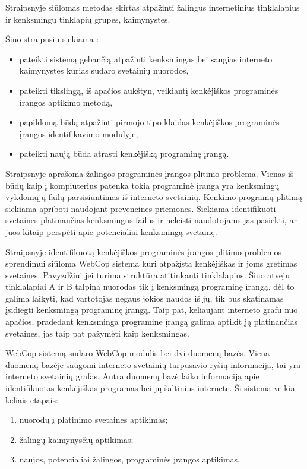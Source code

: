 Straipsnyje  siūlomas  metodas skirtas atpažinti žalingus internetinius tinklalapius ir kenksmingų tinklapių grupes, kaimynystes.

Šiuo straipnsiu siekiama \cite{webcop}:
    \begin{itemize}
        \item pateikti sistemą gebančią atpažinti kenksmingas bei saugias interneto kaimynystes kurias sudaro svetainių nuorodos,
         \item pateikti tikslingą, iš apačios aukštyn, veikiantį kenkėjiškos programinės įrangos aptikimo metodą,
         \item papildomą būdą atpažinti pirmojo tipo klaidas kenkėjiškos programinės įrangos identifikavimo modulyje,
         \item pateikti naują būda atrasti kenkėjišką programinę įrangą.
    \end{itemize}

Straipsnyje aprašoma žalingos programinės įrangos plitimo problema. Vienas iš būdų kaip į kompiuterius patenka  tokia programinė įranga yra kenksmingų vykdomųjų failų parsisiuntimas iš interneto svetainių. Kenkimo programų plitimą siekiama apriboti naudojant prevencines priemones. Siekiama identifikuoti svetaines platinančias kenksmingus failus ir neleisti naudotojams jas pasiekti, ar juos kitaip perspėti apie potencialiai kenksmingą svetainę.

Straipsnyje identifikuotą kenkėjiškos programinės įrangos plitimo problemos sprendimui siūloma WebCop sistema kuri atpažįsta kenkėjiškas ir joms gretimas svetaines. Pavyzdžiui jei turima struktūra atitinkanti  tinklalapius. Šiuo atveju tinklalapiai A ir B talpina nuorodas tik į kenksmingą programinę įrangą, dėl to galima laikyti, kad vartotojas negaus jokios naudos iš jų, tik bus skatinamas įsidiegti kenksmingą programinę įrangą. Taip pat, keliaujant interneto grafu nuo apačios, pradedant kenksminga programine įrangą galima aptikit ją platinančias svetaines, jas taip pat pažymėti kaip kenksmingas.


WebCop sistemą sudaro WebCop modulis bei dvi duomenų bazės. Viena duomenų bazėje saugomi interneto svetainių tarpusavio ryšių informacija, tai yra interneto svetainių grafas. Antra duomenų bazė laiko informaciją apie identifikuotas kenkėjiškas programas bei jų šaltinius internete. Ši sistema veikia keliais etapais:
    \begin{enumerate}[label=\arabic*.]
        \item nuorodų į platinimo svetaines aptikimas;
        \item žalingų kaimynysčių aptikimas;
        \item naujos, potencialiai žalingos, programinės įrangos aptikimas.
    \end{enumerate}

